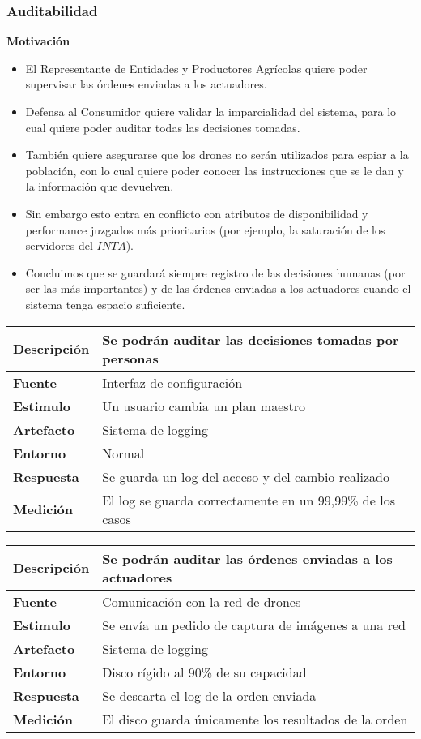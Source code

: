 \subsubsection{Auditabilidad}
\textbf{Motivación}
\begin{itemize}
 \item El Representante de Entidades y Productores Agr\'icolas quiere poder supervisar las órdenes enviadas a los actuadores.
 \item Defensa al Consumidor quiere validar la imparcialidad del sistema, para lo cual quiere poder auditar todas las decisiones tomadas.
 \item También quiere asegurarse que los drones no serán utilizados para espiar a la población, con lo cual quiere poder conocer las instrucciones que se le dan y la información que devuelven.
 \item Sin embargo esto entra en conflicto con atributos de disponibilidad y performance juzgados más prioritarios (por ejemplo, la saturación de los servidores del $INTA$).
 \item Concluimos que se guardará siempre registro de las decisiones humanas (por ser las más importantes) y de las órdenes enviadas a los actuadores cuando el sistema tenga espacio suficiente.
\end{itemize}

\begin{tabular}{| l || p{12cm} |}
\hline 
\textbf{Descripci\'on} & Se podrán auditar las decisiones tomadas por personas \\
\hline 
\textbf{Fuente} & Interfaz de configuración \\
\hline 
\textbf{Estimulo} & Un usuario cambia un plan maestro \\
\hline 
\textbf{Artefacto} & Sistema de logging \\
\hline 
\textbf{Entorno} & Normal \\
\hline 
\textbf{Respuesta} & Se guarda un log del acceso y del cambio realizado \\
\hline 
\textbf{Medici\'on} & El log se guarda correctamente en un 99,99\% de los casos \\
\hline 
\end{tabular}

\medskip

\begin{tabular}{| l || p{12cm} |}
\hline 
\textbf{Descripci\'on} & Se podrán auditar las órdenes enviadas a los actuadores \\
\hline 
\textbf{Fuente} & Comunicación con la red de drones \\
\hline 
\textbf{Estimulo} & Se envía un pedido de captura de imágenes a una red \\
\hline 
\textbf{Artefacto} & Sistema de logging \\
\hline 
\textbf{Entorno} & Disco rígido al 90\% de su capacidad \\
\hline 
\textbf{Respuesta} & Se descarta el log de la orden enviada \\
\hline 
\textbf{Medici\'on} & El disco guarda únicamente los resultados de la orden \\
\hline 
\end{tabular}


